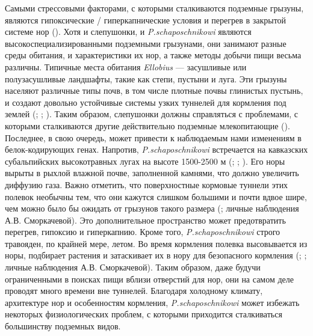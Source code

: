  Самыми стрессовыми факторами, с которыми сталкиваются подземные грызуны, являются гипоксические / гиперкапнические условия и перегрев в закрытой системе нор (\cite{Lacey2000}). Хотя и слепушонки, и \textit{P.schaposchnikowi} являются высокоспециализированными подземными грызунами, они занимают разные среды обитания, и характеристики их нор, а также методы добычи пищи весьма различны. Типичные места обитания \textit{Ellobius} --- засушливые или полузасушливые ландшафты, такие как степи, пустыни и луга. Эти грызуны населяют различные типы почв, в том числе плотные почвы глинистых пустынь, и создают довольно устойчивые системы узких туннелей для кормления под землей (\cite{Ognev1950}; \cite{Gromov1977}; \cite{Shubin1978}). Таким образом, слепушонки должны справляться с проблемами, с которыми сталкиваются другие действительно подземные млекопитающие (\cite{Lacey2000}). Последнее, в свою очередь, может привести к наблюдаемым нами изменениям в белок-кодирующих генах. Напротив, \textit{P.schaposchnikowi} встречается на кавказских субальпийских высокотравных лугах на высоте 1500-2500 м (\cite{Vereshchagin1959}; \cite{Vorontsov1966}; \cite{Krystufek2005}). Его норы вырыты в рыхлой влажной почве, заполненной камнями, что должно увеличить диффузию газа. Важно отметить, что поверхностные кормовые туннели этих полевок необычны тем, что они кажутся слишком большими и почти вдвое шире, чем можно было бы ожидать от грызунов такого размера (\cite{Vorontsov1966}; личные наблюдения А.В. Сморкачевой). Это дополнительное пространство может предотвратить перегрев, гипоксию и гиперкапнию. Кроме того, \textit{P.schaposchnikowi} строго травояден, по крайней мере, летом. Во время кормления полевка высовывается из норы, подбирает растения и затаскивает их в нору для безопасного кормления (\cite{Gambaryan1957}; \cite{Zimina1977}; личные наблюдения А.В. Сморкачевой). Таким образом, даже будучи ограниченными в поисках пищи вблизи отверстий для нор, они на самом деле проводят много времени вне туннелей. Благодаря холодному климату, архитектуре нор и особенностям кормления, \textit{P.schaposchnikowi} может избежать некоторых физиологических проблем, с которыми приходится сталкиваться большинству подземных видов.

